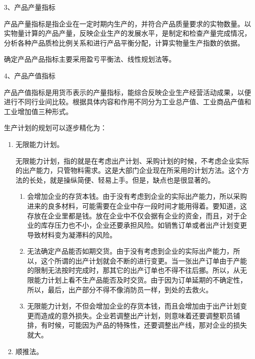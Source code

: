     3、产品产量指标

        产品产量指标是指企业在一定时期内生产的，并符合产品质量要求的实物数量。以实物量计算的产品产量，反映企业生产的发展水平，是制定和检查产量完成情况，分析各种产品质检比例关系和进行产品平衡分配，计算实物量生产指数的依据。

        确定产品产品指标主要采用盈亏平衡法、线性规划法等。

    4、产品产值指标

        产品产值指标是用货币表示的产量指标，能综合反映企业生产经营活动成果，以便进行不同行业间比较。根据具体内容和作用不同分为工业总产值、工业商品产值和工业增加值三种形式。

    生产计划的规划可以逐步精化为：

    \begin{enumerate}
        \item  无限能力计划。

      无限能力计划，指的就是在考虑出产计划、采购计划的时候，不考虑企业实际的出产能力，只管物料需求。这是大部门企业现在所采用的计划方法。这个方法的长处，就是操纵简便、轻易上手。但是，缺点也是很显著的。

        \begin{enumerate}
            \item  会增加企业的存货本钱。由于没有考虑到企业的实际出产能力，所以采购进来的良多材料，可能需要在企业中存一段时间才能用得着。要知道，这存放在企业里都是钱。放在企业中不仅会据有企业的资金，而且，对于企业的库存压力也不小，企业还要承担风险。如销售订单或者出产计划变更导致材料变为凝滞料的风险。
            \item  无法确定产品能否如期交货。由于没有考虑到企业的实际出产能力，所以，这个所谓的出产计划就会不断的进行变更。当一张出产订单由于产能的限制无法按时完成时，那其它的出产订单也不得不往后挪。所以，从无限能力计划上看不生产品能否及时交货。由于因为订单延期的不确定性，所以，最后，出产部分不得不像消防员一样，到处的去救火。
            \item  无限能力计划，不但会增加企业的存货本钱，而且会增加由于出产计划变更而造成的意外损失。企业若调整出产计划，则意味着还要调整职员铺排，有时候，可能因为产品的特殊性，还要调整出产线，那对企业的损失就大。
        \end{enumerate}

        \item  顺推法。


\end{enumerate}

